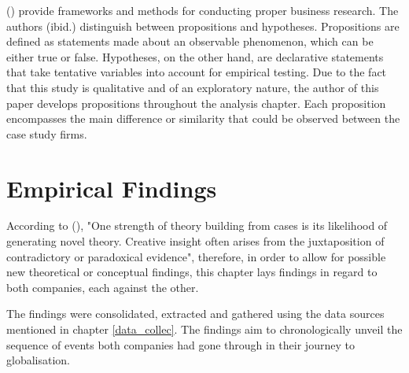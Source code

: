 \documentclass[11pt,a4paper]{article}
\begin{document}
{{\citeauthor{cooperBusinessResearchMethods2014} (\citeyear{cooperBusinessResearchMethods2014}) provide frameworks and methods for conducting proper business research. The authors (ibid.) distinguish between propositions and hypotheses. Propositions are defined as statements made about an observable phenomenon, which can be either true or false. Hypotheses, on the other hand, are declarative statements that take tentative variables into account for empirical testing. Due to the fact that this study is qualitative and of an exploratory nature, the author of this paper develops propositions throughout the analysis chapter. Each proposition encompasses the main difference or similarity that could be observed between the case study firms. 


\section{Empirical Findings}
\label{emp_findings}
According to \citeauthor{eisenhardtBuildingTheoriesCase1989} (\citeyear{eisenhardtBuildingTheoriesCase1989}), "One strength of theory building from cases is its likelihood of generating novel theory. Creative insight often arises from the juxtaposition of contradictory or paradoxical evidence", therefore, in order to allow for possible new theoretical or conceptual findings, this chapter lays findings in regard to both companies, each against the other. \par
The findings were consolidated, extracted and gathered using the data sources mentioned in chapter \ref{data_collec}. The findings aim to chronologically unveil the sequence of events both companies had gone through in their journey to globalisation. 

}}
\end{document}
